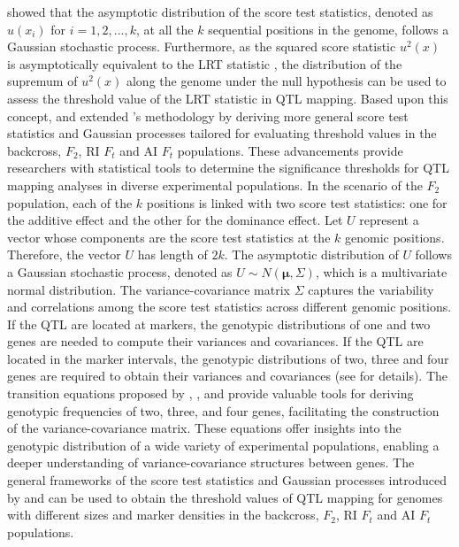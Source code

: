 \citeauthor{Chang-2009} showed that the asymptotic distribution of the score test statistics, denoted as $u(x_{i})$ for $i=1,2,...,k$, at all the $k$ sequential positions in the genome, follows a Gaussian stochastic process. Furthermore, as the squared score statistic $u^{2}(x)$ is asymptotically equivalent to the LRT statistic \citep{Cox-1979, Chang-2009}, the distribution of the supremum of $u^{2}(x)$ along the genome under the null hypothesis can be used to assess the threshold value of the LRT statistic in QTL mapping. Based upon this concept, \citet{Guo-2011} and \citet{Kao-2012} extended \citeauthor{Chang-2009}’s methodology by deriving more general score test statistics and Gaussian processes tailored for evaluating threshold values in the backcross, $F_2$, RI $F_t$ and AI $F_t$ populations. These advancements provide researchers with statistical tools to determine the significance thresholds for QTL mapping analyses in diverse experimental populations. In the scenario of the $F_2$ population, each of the $k$ positions is linked with two score test statistics: one for the additive effect and the other for the dominance effect. Let $U$ represent a vector whose components are the score test statistics at the $k$ genomic positions. Therefore, the vector $U$ has length of $2k$. The asymptotic distribution of $U$ follows a Gaussian stochastic process, denoted as $U\sim N(\boldsymbol{\mu},\Sigma)$, which is a multivariate normal distribution. The variance-covariance matrix $\Sigma$ captures the variability and correlations among the score test statistics across different genomic positions. If the QTL are located at markers, the genotypic distributions of one and two genes are needed to compute their variances and covariances. If the QTL are located in the marker intervals, the genotypic distributions of two, three and four genes are required to obtain their variances and covariances (see \citealt{Kao-2012} for details). The transition equations proposed by \citet{Haldane-1931}, \citet{Geiringer-1944}, and \citet{Kao-2010} provide valuable tools for deriving genotypic frequencies of two, three, and four genes, facilitating the construction of the variance-covariance matrix. These equations offer insights into the genotypic distribution of a wide variety of experimental populations, enabling a deeper understanding of variance-covariance structures between genes. The general frameworks of the score test statistics and Gaussian processes introduced by \citet{Guo-2011} and \citet{Kao-2012} can be used to obtain the threshold values of QTL mapping for genomes with different sizes and marker densities in the backcross, $F_2$, RI $F_t$ and AI $F_t$ populations.

